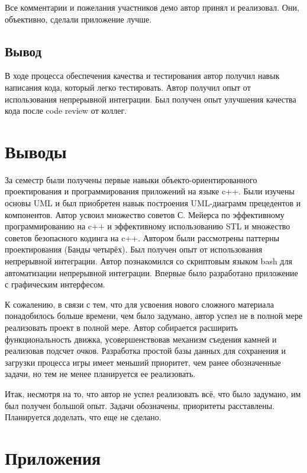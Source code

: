 Все комментарии и пожелания участников демо автор принял и реализовал. Они, объективно, сделали приложение лучше.

\subsection*{Вывод}

В ходе процесса обеспечения качества и тестирования автор получил навык написания кода, который легко тестировать. Автор получил опыт от использования непрерывной интеграции. Был получен опыт улучшения качества кода после code review от коллег.

\section*{Выводы}

За семестр были получены первые навыки объекто-ориентированного проектирования и программирования приложений на языке c++. Были изучены основы UML и был приобретен навык построения UML-диаграмм прецедентов и компонентов. Автор усвоил множество советов С. Мейерса по эффективному программированию на c++ и эффективному использованию STL и множество советов безопасного кодинга на c++. Автором были рассмотрены паттерны проектирования (Банды четырёх). Был получен опыт от использования непрерывной интеграции. Автор познакомился со скриптовым языком bash для автоматизации непрерывной интеграции. Впервые было разработано приложение с графическим интерфесом.

К сожалению, в связи с тем, что для усвоения нового сложного материала понадобилось больше времени, чем было задумано, автор успел не в полной мере реализовать проект в полной мере. Автор собирается расширить функциональность движка, усовершенствовав механизм съедения камней и реализовав подсчет очков. Разработка простой базы данных для сохранения и загрузки процесса игры имеет меньший приоритет, чем ранее обозначенные задачи, но тем не менее планируется ее реализовать.

Итак, несмотря на то, что автор не успел реализовать всё, что было задумано, им был получен большой опыт. Задачи обозначены, приоритеты расставлены. Планируется доделать, что еще не сделано.


\section*{Приложения}

